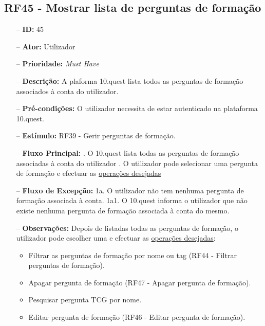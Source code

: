 \subsection{RF45 - Mostrar lista de perguntas de formação}
\begin{itemize}
	\item[--] \textbf{ID:} 45
	\item[--]  \textbf{Ator:} Utilizador
	\item[--]  \textbf{Prioridade:} \textit{Must Have}
	\item[--]  \textbf{Descrição:} A plaforma 10.quest lista todos as perguntas de formação associados à conta do utilizador.
	\item[--]  \textbf{Pré-condições:} O utilizador necessita de estar autenticado na plataforma 10.quest.
	\item[--]  \textbf{Estímulo:} RF39 - Gerir perguntas de formação.
	\item[--]  \textbf{Fluxo Principal:} 
	. O 10.quest lista todas as perguntas de formação associadas à conta do utilizador
	. O utilizador pode selecionar uma pergunta de formação e efectuar as \underline{operações desejadas}
	\item[--]  \textbf{Fluxo de Excepção:} 
	\subitem 1a. O utilizador não tem nenhuma pergunta de formação associada à conta.
	\subitem 1a1. O 10.quest informa o utilizador que não existe nenhuma pergunta de formação associada à conta do mesmo.
	\item[--]  \textbf{Observações:} Depois de listadas todas as perguntas de formação, o utilizador pode escolher uma e efectuar as \underline{operações desejadas}:
	\begin{itemize}
		\item Filtrar as perguntas de formação por nome ou tag (RF44 - Filtrar perguntas de formação).
		\item Apagar pergunta de formação (RF47 - Apagar pergunta de formação).
		\item Pesquisar pergunta TCG por nome.
		\item Editar pergunta de formação (RF46 - Editar pergunta de formação).
	\end{itemize}
\end{itemize}
\newpage

